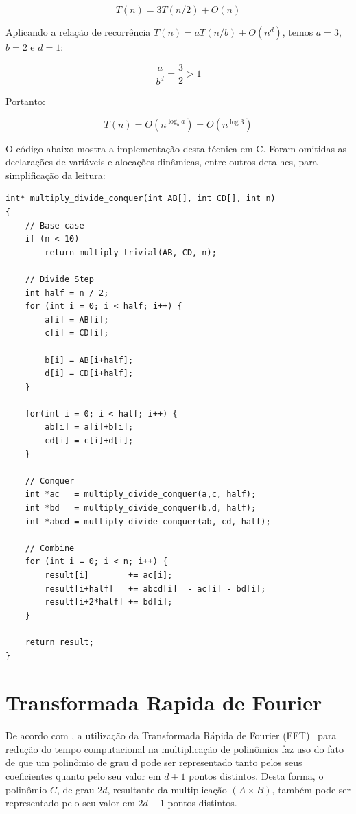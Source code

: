 \documentclass[
	12pt,				%
	oneside,			%
	a4paper,			%
	english,			%
	french,				%
	spanish,			%
	brazil,				%
	]{abntex2}
\begin{document}
\[ T(n) = 3T(n/2) + O(n)\]

Aplicando a relação de recorrência $T(n) = aT(n/b) + O(n^d)$, temos $a = 3$, $b=2$ e $d=1$:

\[\frac{a}{b^d}=\frac{3}{2} > 1\]

Portanto:

\[T(n)=O(n^{\log_{b}{a}})=O(n^{\log3})\]

O código abaixo mostra a implementação desta técnica em C. Foram omitidas as declarações de variáveis e alocações dinâmicas, entre outros detalhes, para simplificação da leitura:
\begin{lstlisting}[mathescape=true, label=divisao_conquista]
int* multiply_divide_conquer(int AB[], int CD[], int n)
{
    // Base case
    if (n < 10)
        return multiply_trivial(AB, CD, n);

    // Divide Step
    int half = n / 2;
    for (int i = 0; i < half; i++) {
        a[i] = AB[i];
        c[i] = CD[i];

        b[i] = AB[i+half];
        d[i] = CD[i+half];
    }

    for(int i = 0; i < half; i++) {
        ab[i] = a[i]+b[i];
        cd[i] = c[i]+d[i];
    }

    // Conquer
    int *ac   = multiply_divide_conquer(a,c, half);
    int *bd   = multiply_divide_conquer(b,d, half);
    int *abcd = multiply_divide_conquer(ab, cd, half);

    // Combine
    for (int i = 0; i < n; i++) {
        result[i]        += ac[i];
        result[i+half]   += abcd[i]  - ac[i] - bd[i];
        result[i+2*half] += bd[i];
    }

    return result;
}
\end{lstlisting}

\section{Transformada Rapida de Fourier}


De acordo com \cite{dasgupta2006}, a utilização da Transformada Rápida de Fourier (FFT)~\cite{brigham1988f} para redução do tempo computacional na multiplicação de polinômios faz uso do fato de que um polinômio de grau d pode ser representado tanto pelos seus coeficientes quanto pelo seu valor em $d+1$ pontos distintos. Desta forma, o polinômio $C$, de grau $2d$, resultante da multiplicação $(A\times{B})$, também pode ser representado pelo seu valor em $2d+1$ pontos distintos.
\end{document}
